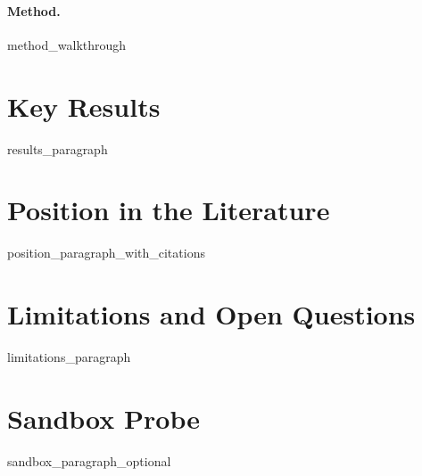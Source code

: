 \documentclass[11pt]{article}
\begin{document}
\paragraph{Method.}
{{method_walkthrough}}

\section{Key Results}
{{results_paragraph}}

\section{Position in the Literature}
{{position_paragraph_with_citations}}

\section{Limitations and Open Questions}
{{limitations_paragraph}}

\section*{Sandbox Probe}
{{sandbox_paragraph_optional}}



\end{document}
